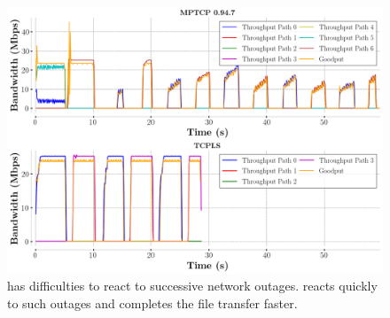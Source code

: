 \begin{figure}[!t]
  \begin{center}
    \includegraphics[width=\columnwidth]{figures/tcpls_mptcp.png}
  \end{center}
  \caption{\mptcp has difficulties to react to successive network outages.
  \tcpls reacts quickly to such outages and completes the file transfer faster.}
  \label{fig:failover}
\end{figure}

